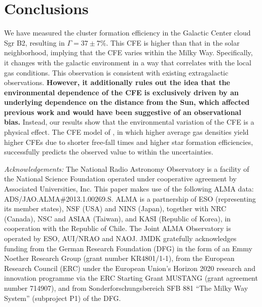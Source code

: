 \documentclass[twocolumn]{aastex62}
\def\referee#1{\textbf{#1}}
\begin{document}
\section{Conclusions}
We have measured the cluster formation efficiency in the Galactic Center cloud
Sgr B2, resulting in $\Gamma=37\pm7\%$. This CFE is higher than that in the solar
neighborhood, implying that the CFE varies within the Milky Way. Specifically,
it changes with the galactic environment in a way that correlates with the
local gas conditions. This observation is consistent with existing extragalactic
observations.  \referee{However, it additionally rules out the idea that the
environmental dependence of the CFE is exclusively driven by an underlying
dependence on the distance from the Sun, which affected previous work and would have
been suggestive of an observational bias.} Instead, our results show that the
environmental variation of the CFE is a physical effect. The CFE model of
\citet{Kruijssen2012a}, in which higher average gas densities yield higher CFEs
due to shorter free-fall times and higher star formation efficiencies,
successfully predicts the observed value to within the uncertainties.



\textit{Acknowledgements:}
The National Radio Astronomy Observatory is a facility of the National Science
Foundation operated under cooperative agreement by Associated Universities,
Inc.
This paper makes use of the following ALMA data: ADS/JAO.ALMA\#2013.1.00269.S.
ALMA is a partnership of ESO (representing its member states), NSF (USA) and
NINS (Japan), together with NRC (Canada), NSC and ASIAA (Taiwan), and KASI
(Republic of Korea), in cooperation with the Republic of Chile. The Joint ALMA
Observatory is operated by ESO, AUI/NRAO and NAOJ.
JMDK gratefully acknowledges funding from the German
Research Foundation (DFG) in the form of an Emmy Noether Research Group (grant
number KR4801/1-1), from the European Research Council (ERC) under the European
Union's Horizon 2020 research and innovation programme via the ERC Starting
Grant MUSTANG (grant agreement number 714907), and from Sonderforschungsbereich
SFB 881 ``The Milky Way System'' (subproject P1) of the DFG.



\end{document}
